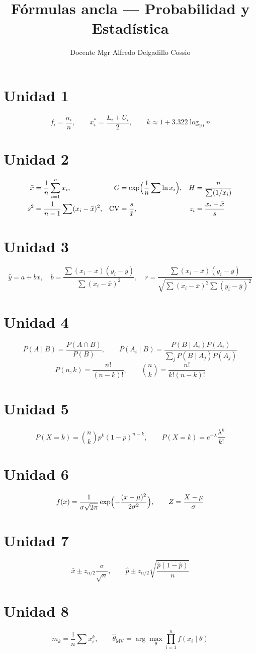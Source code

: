 \documentclass{article}
\title{Fórmulas ancla --- Probabilidad y Estadística}
\author{Docente Mgr Alfredo Delgadillo Cossio}
\date{}
\begin{document}
\maketitle

\section{Unidad 1}
\[
f_i = \frac{n_i}{n},\qquad
x_i^* = \frac{L_i+U_i}{2},\qquad
k \approx 1 + 3.322\log_{10} n
\]

\section{Unidad 2}
\begin{align*}
\bar{x} &= \frac{1}{n}\sum_{i=1}^n x_i, &
G &= \exp\Bigl(\frac{1}{n}\sum \ln x_i\Bigr), &
H &= \frac{n}{\sum (1/x_i)} \\
s^2 &= \frac{1}{n-1}\sum (x_i-\bar{x})^2, &
\mathrm{CV} &= \frac{s}{\bar{x}}, &
z_i &= \frac{x_i-\bar{x}}{s}
\end{align*}

\section{Unidad 3}
\[
\hat{y}=a+bx,\quad
b=\frac{\sum(x_i-\bar{x})(y_i-\bar{y})}{\sum(x_i-\bar{x})^2},\quad
r=\frac{\sum(x_i-\bar{x})(y_i-\bar{y})}{\sqrt{\sum(x_i-\bar{x})^2\sum(y_i-\bar{y})^2}}
\]

\section{Unidad 4}
\[
P(A\mid B)=\frac{P(A\cap B)}{P(B)},\qquad
P(A_i\mid B)=\frac{P(B\mid A_i)P(A_i)}{\sum_j P(B\mid A_j)P(A_j)}
\]
\[
P(n,k)=\frac{n!}{(n-k)!},\qquad
\binom{n}{k}=\frac{n!}{k!(n-k)!}
\]

\section{Unidad 5}
\[
P(X=k)=\binom{n}{k}p^k(1-p)^{n-k},\qquad
P(X=k)=e^{-\lambda}\frac{\lambda^k}{k!}
\]

\section{Unidad 6}
\[
f(x)=\frac{1}{\sigma\sqrt{2\pi}}\exp\Bigl(-\frac{(x-\mu)^2}{2\sigma^2}\Bigr),\qquad
Z=\frac{X-\mu}{\sigma}
\]

\section{Unidad 7}
\[
\bar{x}\pm z_{\alpha/2}\frac{\sigma}{\sqrt{n}},\qquad
\hat{p}\pm z_{\alpha/2}\sqrt{\frac{\hat{p}(1-\hat{p})}{n}}
\]

\section{Unidad 8}
\[
m_k=\frac{1}{n}\sum x_i^k,\qquad
\hat{\theta}_{\mathrm{MV}}=\arg\max_\theta \prod_{i=1}^n f(x_i\mid\theta)
\]
\end{document}
